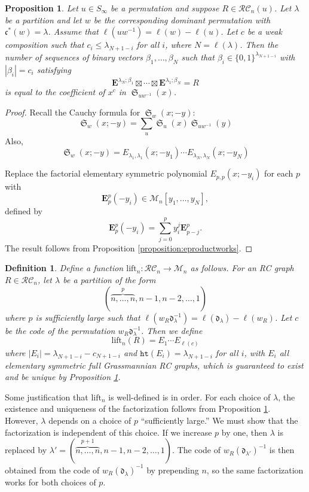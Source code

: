 \documentclass[pdflatex,sn-mathphys-num]{sn-jnl}
\numberwithin{equation}{subsection}
\DeclareMathOperator{\sch}{\mathfrak{S}}
\newcommand{\wof}[1]{w_{#1}}
\newcommand{\hr}{\mathtt{ht}}
\newcommand{\RC}{\mathcal{RC}}
\newcommand{\dom}{\mathfrak{d}}
\newcommand{\code}{\mathfrak{c}}
\theoremstyle{thmstyleone}
\newtheorem{proposition}[lemma]{Proposition}
\theoremstyle{thmstylethree}
\newtheorem{definition}[lemma]{Definition}
\theoremstyle{thmstyletwo}
\begin{document}
\begin{proposition} \label{proposition:elemfactor}
  Let $u\in S_\infty$ be a permutation and suppose $R\in \RC_n(u)$. Let $\lambda$ be a partition and let $w$ be the corresponding dominant permutation with $\code^*(w)=\lambda$. Assume that $\ell(uw^{-1}) = \ell(w)-\ell(u)$. Let $c$ be a weak composition such that $c_i\leq \lambda_{N + 1 - i}$ for all $i$, where $N=\ell(\lambda)$. Then the number of sequences of binary vectors $\beta_1,\ldots,\beta_N$ such that $\beta_i\in\{0,1\}^{\lambda_{N + 1 - i}}$ with $|\beta_i|=c_i$ satisfying
  $$\mathbf{E}^{\lambda_N;\beta_1}\boxtimes\cdots\boxtimes \mathbf{E}^{\lambda_1;\beta_N} = R$$
is equal to the coefficient of $x^c$ in $\sch_{uw^{-1}}(x)$.
\end{proposition}
\begin{proof}
  Recall the Cauchy formula for $\sch_w(x;-y)$:
  $$\sch_w(x;-y)=\sum_u \sch_u(x)\sch_{uw^{-1}}(y)$$
  Also,
  $$\sch_w(x;-y) = E_{\lambda_1,\lambda_1}(x;-y_1)\cdots E_{\lambda_N,\lambda_N}(x;-y_N)$$

Replace the factorial elementary symmetric polynomial $E_{p,p}(x;-y_i)$ for each $p$ with
$$\mathbf{E}_p^p(-y_i)\in \mathcal{M}_n[y_1,\ldots,y_N],$$
defined by
$$\mathbf{E}_p^p(-y_i) = \sum_{j=0}^p y_i^j \mathbf{E}_{p-j}^p.$$ 
The result follows from Proposition \ref{proposition:eproductworks}.
\end{proof}



\begin{definition}
  Define a function $\mathrm{lift}_n:\RC_n\to \mathcal{M}_n$ as follows. For an RC graph $R\in \RC_n$, let $\lambda$ be a partition of the form 
$$(\overbrace{n,\ldots,n}^{p},n-1,n-2,\ldots,1)$$
where $p$ is sufficiently large such that $\ell(\wof{R}\dom_\lambda^{-1}) = \ell(\dom_\lambda) - \ell(\wof{R})$.  Let $c$ be the code of the permutation $\wof{R}\dom_\lambda^{-1}$. Then we define
$$\mathrm{lift}_n(R) = E_1 \cdots  E_{\ell(c)}$$
where $|E_i| = \lambda_{N + 1 - i} - c_{N + 1 - i}$ and $\hr(E_i) = \lambda_{N+1-i}$ for all $i$, with $E_i$ all elementary symmetric full Grassmannian RC graphs, which is guaranteed to exist and be unique by Proposition \ref{proposition:elemfactor}. 
\end{definition}

Some justification that $\mathrm{lift}_n$ is well-defined is in order. For each choice of $\lambda$, the existence and uniqueness of the factorization follows from Proposition \ref{proposition:elemfactor}. However, $\lambda$ depends on a choice of $p$ ``sufficiently large.'' We must show that the factorization is independent of this choice. If we increase $p$ by one, then $\lambda$ is replaced by $\lambda' = (\overbrace{n,\ldots,n}^{p+1},n-1,n-2,\ldots,1)$. The code of $\wof{R}(\dom_{\lambda'})^{-1}$ is then obtained from the code of $\wof{R}(\dom_\lambda)^{-1}$ by prepending $n$, so the same factorization works for both choices of $p$.
\end{document}

